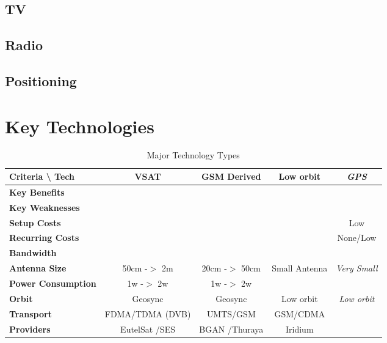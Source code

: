 \subsection{TV}
\label{tv}

\subsection{Radio}
\label{radio}

\subsection{Positioning}
\label{positioning}

\section{Key Technologies}
\label{keytechnologies}

 \begin{landscape} 

\begin{table}[htbp]
\begin{minipage}{\linewidth}
\setlength{\tymax}{0.5\linewidth}
\centering
\small
\caption{Major Technology Types}
\label{majortechnologytypes}
\begin{tabulary}{\textwidth}{@{}LCCCC@{}} \toprule
Criteria \textbackslash{} Tech&VSAT&GSM Derived&Low orbit&\emph{GPS}\\
\midrule
\textbf{Key Benefits}&&&&\\
\textbf{Key Weaknesses}&&&&\\
\textbf{Setup Costs}&&&&Low\\
\textbf{Recurring Costs}&&&&None\slash Low\\
\textbf{Bandwidth}&&&&\\
\textbf{Antenna Size}&50cm -$>$ 2m&20cm -$>$ 50cm&Small Antenna&\emph{Very Small}\\
\textbf{Power Consumption}&1w -$>$ 2w&1w -$>$ 2w&&\\
\textbf{Orbit}&Geosync&Geosync&Low orbit&\emph{Low orbit}\\
\textbf{Transport}&FDMA\slash TDMA (DVB)&UMTS\slash GSM&GSM\slash CDMA&\\
\textbf{Providers}&EutelSat \slash  SES&BGAN \slash  Thuraya&Iridium&\\

\bottomrule

\end{tabulary}
\end{minipage}
\end{table}

 \end{landscape} 


